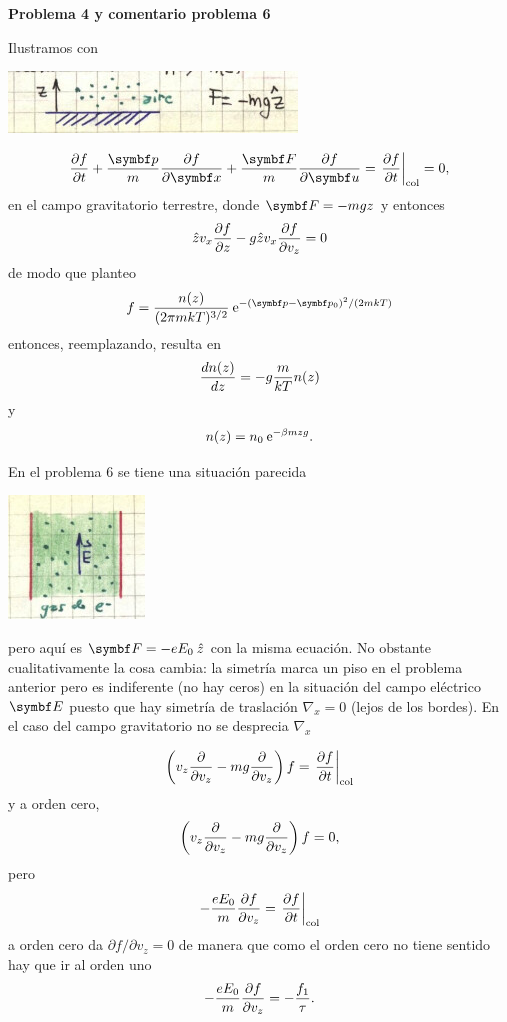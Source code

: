\documentclass[10pt,oneside]{CBFT_book}
\begin{document}
\begin{ejemplo}{\bf Problema 4 y comentario problema 6}

Ilustramos con

\includegraphics[scale=0.5]{images/1606329354.jpg}
 
\[
	\dpar{f}{t} + \frac{\vbp}{m} \dpar{f}{\vbx} + \frac{\vb{F}}{m}\dpar{f}{\vb{u}} =
	\left.\dpar{f}{t}\right|_\text{col} = 0,
\] 
en el campo gravitatorio terrestre, donde $\vb{F} = - m g z$ y entonces
\[
	\hat{z} v_x \frac{\partial^{\hspace{-0.05em}} {f}}{\partial {z}^{\hspace{-0.05em}}} - g \hat{z} v_x \frac{\partial^{\hspace{-0.05em}} {f}}{\partial {v_z}^{\hspace{-0.05em}}} = 0
\]
de modo que planteo 
\[
	f = \frac{ n(z) }{( 2 \pi m k T )^{3/2}} \euler^{- (\vbp - \vbp_0)^2 / (2mkT)}
\]
entonces, reemplazando, resulta en
\[
	\frac{d^{\hspace{-0.05em}} {n(z)}}{d {z}^{\hspace{-0.05em}}} = - g \frac{m}{kT} n(z)
\]
y
\[
	n(z) = n_0 \:\mathrm{e}^{-\beta m z g}.
\]
 
En el problema 6 se tiene una situación parecida 

\includegraphics[scale=0.5]{images/1606329360.jpg}

pero aquí es $\vb{F} = - e E_0 \zver$ con la misma ecuación. No obstante cualitativamente la cosa cambia:
la simetría marca un piso en el problema anterior pero es indiferente (no hay ceros) en la situación del
campo eléctrico $\vb{E}$ puesto que hay simetría de traslación $ \nabla_x = 0$ (lejos de los bordes).
En el caso del campo gravitatorio no se desprecia $ \nabla_x $

\[
	\left( v_z \frac{\partial^{\hspace{-0.05em}} {}}{\partial {v_z}^{\hspace{-0.05em}}} - m g \frac{\partial^{\hspace{-0.05em}} {}}{\partial {v_z}^{\hspace{-0.05em}}} \right) f = \left.\frac{\partial^{\hspace{-0.05em}} {f}}{\partial {t}^{\hspace{-0.05em}}}\right|_\text{col}
\]
y a orden cero,
\[
	\left( v_z \frac{\partial^{\hspace{-0.05em}} {}}{\partial {v_z}^{\hspace{-0.05em}}} - m g \frac{\partial^{\hspace{-0.05em}} {}}{\partial {v_z}^{\hspace{-0.05em}}} \right) f = 0,
\]
pero 
\[
	- \frac{eE_0}{m} \frac{\partial^{\hspace{-0.05em}} {f}}{\partial {v_z}^{\hspace{-0.05em}}} = \left.\frac{\partial^{\hspace{-0.05em}} {f}}{\partial {t}^{\hspace{-0.05em}}}\right|_\text{col}
\]
a orden cero da $\partial f / \partial v_z = 0 $ de manera que como el orden cero no tiene sentido hay que
ir al orden uno
\[
	- \frac{eE_0}{m} \frac{\partial^{\hspace{-0.05em}} {f}}{\partial {v_z}^{\hspace{-0.05em}}} = - \frac{f_1}{\tau}.
\]
  
\end{ejemplo}
\end{document}
